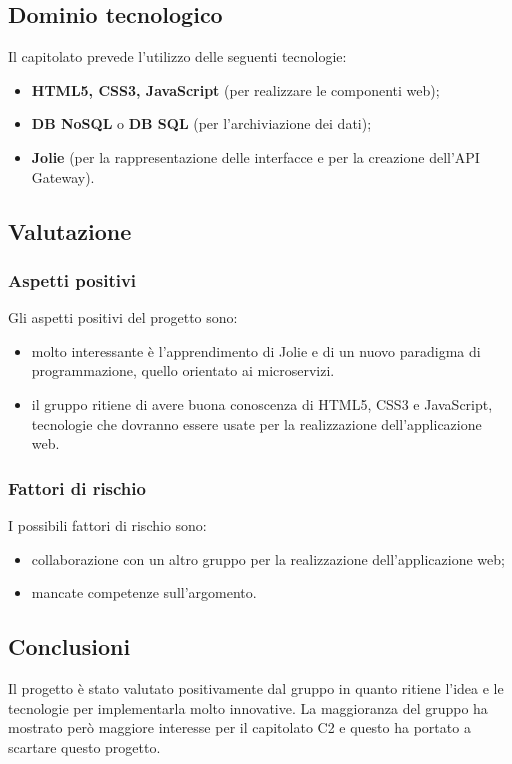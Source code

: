 	\subsection {Dominio tecnologico}
		Il capitolato prevede l'utilizzo delle seguenti tecnologie:
		\begin {itemize}
			\item \textbf{HTML5, CSS3, JavaScript} (per realizzare le componenti web);
			\item \textbf{DB NoSQL} o \textbf{DB SQL} (per l'archiviazione dei dati);
			\item \textbf{Jolie} (per la rappresentazione delle interfacce e per la creazione dell'API Gateway).
		\end {itemize}
	\subsection {Valutazione}
		\subsubsection {Aspetti positivi}
		Gli aspetti positivi del progetto sono:
			\begin{itemize}
				\item molto interessante è l'apprendimento di Jolie e di un nuovo paradigma di programmazione, quello orientato ai microservizi.
				\item il gruppo ritiene di avere buona conoscenza di HTML5, CSS3 e JavaScript, tecnologie che dovranno essere usate per la realizzazione dell'applicazione web.
			\end{itemize}
		\subsubsection {Fattori di rischio}
		I possibili fattori di rischio sono:
			\begin{itemize}
				\item collaborazione con un altro gruppo per la realizzazione dell'applicazione web;
				\item mancate competenze sull'argomento.
			\end{itemize}
	\subsection {Conclusioni}
		Il progetto è stato valutato positivamente dal gruppo in quanto ritiene l'idea e le tecnologie per implementarla molto innovative. La maggioranza del gruppo ha mostrato però maggiore interesse
		per il capitolato C2 e questo ha portato a scartare questo progetto.

